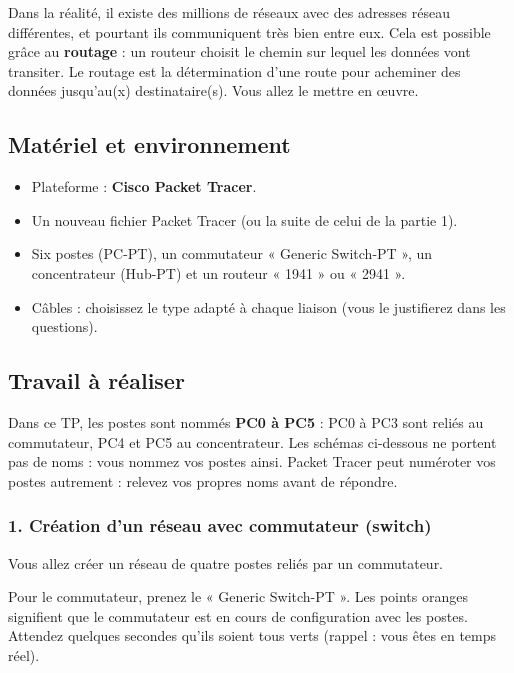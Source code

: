 \documentclass[
  french,
  10pt,
  a4paper,
]{scrartcl}
\providecommand{\tightlist}{%
  \setlength{\itemsep}{0pt}\setlength{\parskip}{0pt}}
\begin{document}
Dans la réalité, il existe des millions de réseaux avec des adresses
réseau différentes, et pourtant ils communiquent très bien entre eux.
Cela est possible grâce au \textbf{routage} : un routeur choisit le
chemin sur lequel les données vont transiter. Le routage est la
détermination d'une route pour acheminer des données jusqu'au(x)
destinataire(s). Vous allez le mettre en œuvre.

\subsection{Matériel et
environnement}\label{matuxe9riel-et-environnement}

\begin{itemize}
\tightlist
\item
  Plateforme : \textbf{Cisco Packet Tracer}.
\item
  Un nouveau fichier Packet Tracer (ou la suite de celui de la partie
  1).
\item
  Six postes (PC-PT), un commutateur « Generic Switch-PT », un
  concentrateur (Hub-PT) et un routeur « 1941 » ou « 2941 ».
\item
  Câbles : choisissez le type adapté à chaque liaison (vous le
  justifierez dans les questions).
\end{itemize}

\subsection{Travail à réaliser}\label{travail-uxe0-ruxe9aliser}

Dans ce TP, les postes sont nommés \textbf{PC0 à PC5} : PC0 à PC3 sont
reliés au commutateur, PC4 et PC5 au concentrateur. Les schémas
ci-dessous ne portent pas de noms : vous nommez vos postes ainsi. Packet
Tracer peut numéroter vos postes autrement : relevez vos propres noms
avant de répondre.

\subsubsection{1. Création d'un réseau avec commutateur
(switch)}\label{cruxe9ation-dun-ruxe9seau-avec-commutateur-switch}

Vous allez créer un réseau de quatre postes reliés par un commutateur.

\begin{tcolorbox}[enhanced jigsaw, arc=.35mm, bottomrule=.15mm, bottomtitle=1mm, breakable, colback=white, colbacktitle=quarto-callout-note-color!10!white, colframe=quarto-callout-note-color-frame, coltitle=black, left=2mm, leftrule=.75mm, opacityback=0, opacitybacktitle=0.6, rightrule=.15mm, title=\textcolor{quarto-callout-note-color}{\faInfo}\hspace{0.5em}{Remarque}, titlerule=0mm, toprule=.15mm, toptitle=1mm]

Pour le commutateur, prenez le « Generic Switch-PT ». Les points oranges
signifient que le commutateur est en cours de configuration avec les
postes. Attendez quelques secondes qu'ils soient tous verts (rappel :
vous êtes en temps réel).

\end{tcolorbox}
\end{document}
